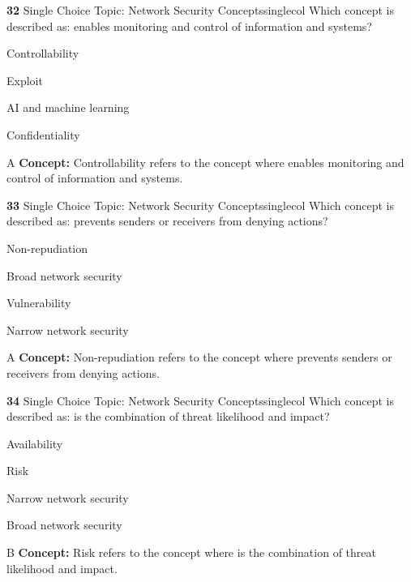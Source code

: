 \documentclass[10pt,a4paper]{article}
\begin{document}
\begin{qcard}{\color{white}\textbf{32} \hfill \small Single Choice \textbar{} Topic: Network Security Concepts}{singlecol}
Which concept is described as: enables monitoring and control of information and systems?

\begin{qoptions}
\item Controllability
\item Exploit
\item AI and machine learning
\item Confidentiality
\end{qoptions}
\begin{explainbox}{A}
\textbf{Concept:} Controllability refers to the concept where enables monitoring and control of information and systems.
\end{explainbox}
\end{qcard}

\begin{qcard}{\color{white}\textbf{33} \hfill \small Single Choice \textbar{} Topic: Network Security Concepts}{singlecol}
Which concept is described as: prevents senders or receivers from denying actions?

\begin{qoptions}
\item Non-repudiation
\item Broad network security
\item Vulnerability
\item Narrow network security
\end{qoptions}
\begin{explainbox}{A}
\textbf{Concept:} Non-repudiation refers to the concept where prevents senders or receivers from denying actions.
\end{explainbox}
\end{qcard}

\begin{qcard}{\color{white}\textbf{34} \hfill \small Single Choice \textbar{} Topic: Network Security Concepts}{singlecol}
Which concept is described as: is the combination of threat likelihood and impact?

\begin{qoptions}
\item Availability
\item Risk
\item Narrow network security
\item Broad network security
\end{qoptions}
\begin{explainbox}{B}
\textbf{Concept:} Risk refers to the concept where is the combination of threat likelihood and impact.
\end{explainbox}
\end{qcard}
\end{document}
